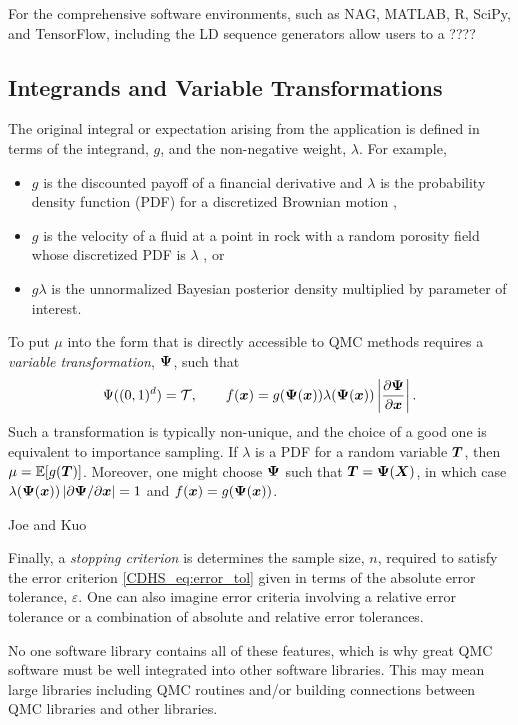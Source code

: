 \documentclass[graybox]{svmult}
\begin{document}
For the comprehensive software environments, such as NAG, MATLAB, R, SciPy, and TensorFlow, including the LD sequence generators allow users to a ????


\subsection{Integrands and Variable Transformations} The original integral or expectation arising from the application is defined in terms of the integrand, $g$, and the non-negative weight, $\lambda$.  For example,
\begin{itemize}
	\item $g$ is the discounted payoff of a financial derivative and $\lambda$ is the probability density function (PDF) for a discretized Brownian motion \cite{Gla03},

	\item  $g$ is the velocity of a fluid at a point in rock with a random porosity field whose discretized PDF is $\lambda$ \cite{}, or

	\item $g\lambda$ is the unnormalized Bayesian posterior density multiplied by parameter of interest.
\end{itemize}

To put $\mu$ into the form that is directly accessible to QMC methods requires a \emph{variable transformation}, ${\boldsymbol{\Psi}}$, such that
\begin{equation*}
    \Psi((0,1)^d) = {\mathcal{T}}, \qquad f({\boldsymbol{x}}) = g({\boldsymbol{\Psi}}({\boldsymbol{x}})) \lambda({\boldsymbol{\Psi}}({\boldsymbol{x}})) \left\vert\frac{\partial {\boldsymbol{\Psi}}}{\partial{\boldsymbol{x}}}\right\vert.
\end{equation*}
Such a transformation is typically non-unique, and the choice of a good one is equivalent to importance sampling.  If $\lambda$ is a PDF for a random variable ${\boldsymbol{T}}$, then $\mu = {\mathbb{E}}[g({\boldsymbol{T}})]$.  Moreover, one might choose ${\boldsymbol{\Psi}}$ such that ${\boldsymbol{T}} = {\boldsymbol{\Psi}}({\boldsymbol{X}})$, in which case $\lambda({\boldsymbol{\Psi}}({\boldsymbol{x}})) \left\vert\partial {\boldsymbol{\Psi}}/\partial{\boldsymbol{x}}\right\vert = 1$ and $f({\boldsymbol{x}}) = g({\boldsymbol{\Psi}}({\boldsymbol{x}}))$.


 Joe and Kuo



Finally, a \emph{stopping criterion} is determines the sample size, $n$, required to satisfy the error criterion \eqref{CDHS_eq:error_tol} given in terms of the absolute error tolerance, $\varepsilon$.  One can also imagine error criteria involving a relative error tolerance or a combination of absolute and relative error tolerances.

No one software library contains all of these features, which is why great QMC software must be well integrated into other software libraries.  This may mean large libraries including QMC routines and/or building connections between QMC libraries and other libraries.
\end{document}
